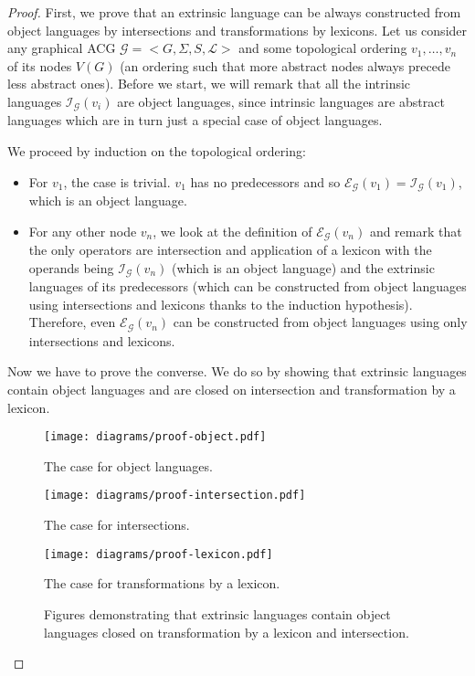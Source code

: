 \begin{proof}
  First, we prove that an extrinsic language can be always constructed
  from object languages by intersections and transformations by
  lexicons. Let us consider any graphical ACG $\mathcal{G} =
  \mathopen{<} G, \Sigma, S, \mathcal{L} \mathclose{>}$ and some
  topological ordering $v_1, \ldots, v_n$ of its nodes $V(G)$ (an
  ordering such that more abstract nodes always precede less abstract
  ones). Before we start, we will remark that all the intrinsic
  languages $\mathcal{I}_{\mathcal{G}}(v_i)$ are object languages, since
  intrinsic languages are abstract languages which are in turn just a
  special case of object languages.

  We proceed by induction on the topological ordering:

  \begin{itemize}
    \item For $v_1$, the case is trivial. $v_1$ has no predecessors and
      so $\mathcal{E}_{\mathcal{G}}(v_1) =
      \mathcal{I}_{\mathcal{G}}(v_1)$, which is an object language.
    \item For any other node $v_n$, we look at the definition of
      $\mathcal{E}_{\mathcal{G}}(v_n)$ and remark that the only
      operators are intersection and application of a lexicon with the
      operands being $\mathcal{I}_{\mathcal{G}}(v_n)$ (which is an
      object language) and the extrinsic languages of its predecessors
      (which can be constructed from object languages using
      intersections and lexicons thanks to the induction
      hypothesis). Therefore, even $\mathcal{E}_{\mathcal{G}}(v_n)$ can
      be constructed from object languages using only intersections and
      lexicons.
  \end{itemize}


  Now we have to prove the converse. We do so by showing that extrinsic
  languages contain object languages and are closed on intersection and
  transformation by a lexicon.

  \begin{figure}
    \centering
    \begin{minipage}[b]{0.2\textwidth}
      \centering
      \texttt{[image: diagrams/proof-object.pdf]}
      \caption{\label{fig:proof-object} The case for object languages.}
    \end{minipage}
    \quad
    \begin{minipage}[b]{0.4\textwidth}
      \centering
      \texttt{[image: diagrams/proof-intersection.pdf]}
      \caption{\label{fig:proof-intersection} The case for intersections.}
    \end{minipage}
    \quad
    \begin{minipage}[b]{0.3\textwidth}
      \centering
      \texttt{[image: diagrams/proof-lexicon.pdf]}
      \caption{\label{fig:proof-lexicon} The case for transformations by
        a lexicon.}
    \end{minipage}
    \caption{Figures demonstrating that extrinsic languages contain
      object languages closed on transformation by a lexicon and
      intersection.}
  \end{figure}


\end{proof}
